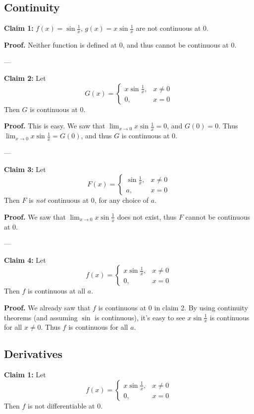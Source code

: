 \subsection{Continuity}

\textbf{Claim 1:} $f(x)=\sin \frac{1}{x}$, $g(x)=x\sin \frac{1}{x}$
are not continuous at $0$.

\textbf{Proof.} Neither function is defined at $0$, and thus cannot be
continuous at $0$.

\vs---\vs

\textbf{Claim 2:} Let
\[G(x)=\begin{cases}
  x\sin \frac{1}{x},&x\neq0\\
  0,&x=0
\end{cases}\]
Then $G$ is continuous at $0$. 

\vs

\textbf{Proof.} This is easy. We saw that $\lim_{x\to0}x\sin
\frac{1}{x}=0$, and $G(0)=0$. Thus $\lim_{x\to0}x\sin
\frac{1}{x}=G(0)$, and thus $G$  is continuous at $0$.

\vs---\vs

\textbf{Claim 3:} Let
\[F(x)=\begin{cases}
  \sin \frac{1}{x},&x\neq0\\
  a,&x=0
\end{cases}\]
Then $F$ is \textit{not} continuous at $0$, for any choice of $a$.

\vs

\textbf{Proof.} We saw that $\lim_{x\to0}x\sin \frac{1}{x}$ does not
exist, thus $F$ cannot be continuous at $0$.

\vs---\vs

\textbf{Claim 4:} Let
\[f(x)=\begin{cases}
  x\sin \frac{1}{x},&x\neq0\\
  0,&x=0
\end{cases}\]
Then $f$ is continuous at all $a$.

\vs

\textbf{Proof.} We already saw that $f$ is continuous at $0$ in claim
2. By using continuity theorems (and assuming $\sin$ is continuous),
it's easy to see $x\sin \frac{1}{x}$ is continuous for all $x\neq0$. Thus
$f$ is continuous for all $a$.


\subsection{Derivatives}

\textbf{Claim 1:} Let
\[f(x)=\begin{cases}
  x\sin \frac{1}{x},&x\neq0\\
  0,&x=0
\end{cases}\]
Then $f$ is not differentiable at $0$.

